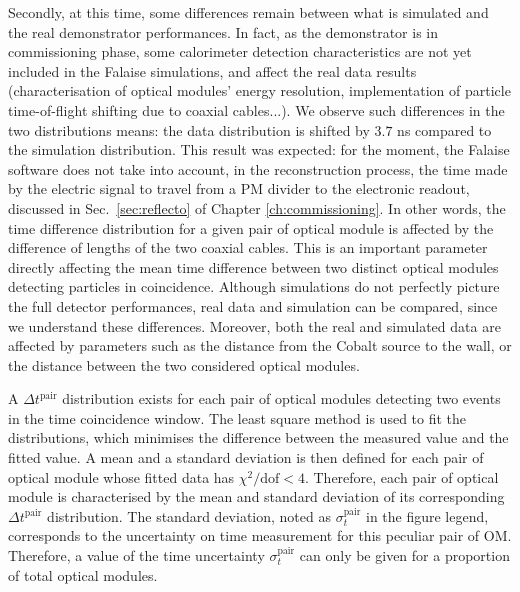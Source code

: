 Secondly, at this time, some differences remain between what is simulated and the real demonstrator performances.
In fact, as the demonstrator is in commissioning phase, some calorimeter detection characteristics are not yet included in the Falaise simulations, and affect the real data results (characterisation of optical modules' energy resolution, implementation of particle time-of-flight shifting due to coaxial cables...).
We observe such differences in the two distributions means: the data distribution is shifted by $3.7$ ns compared to the simulation distribution.
This result was expected: for the moment, the Falaise software does not take into account, in the reconstruction process, the time made by the electric signal to travel from a PM divider to the electronic readout, discussed in Sec.~\ref{sec:reflecto} of Chapter \ref{ch:commissioning}.
In other words, the time difference distribution for a given pair of optical module is affected by the difference of lengths of the two coaxial cables.
This is an important parameter directly affecting the mean time difference between two distinct optical modules detecting particles in coincidence.
Although simulations do not perfectly picture the full detector performances, real data and simulation can be compared, since we understand these differences.
Moreover, both the real and simulated data are affected by parameters such as the distance from the Cobalt source to the wall, or the distance between the two considered optical modules.

A $\Delta t^{\text{pair}}$ distribution exists for each pair of optical modules detecting two events in the time coincidence window.
The least square method is used to fit the distributions, which minimises the difference between the measured value and the fitted value.
A mean and a standard deviation is then defined for each pair of optical module whose fitted data has $\chi^{2}/\text{dof}<4$.
Therefore, each pair of optical module is characterised by the mean and standard deviation of its corresponding $\Delta t^{\text{pair}}$ distribution.
The standard deviation, noted as $\sigma_{t}^{\text{pair}}$ in the figure legend, corresponds to the uncertainty on time measurement for this peculiar pair of OM.
Therefore, a value of the time uncertainty $\sigma_{t}^{\text{pair}}$ can only be given for a proportion of total optical modules.

